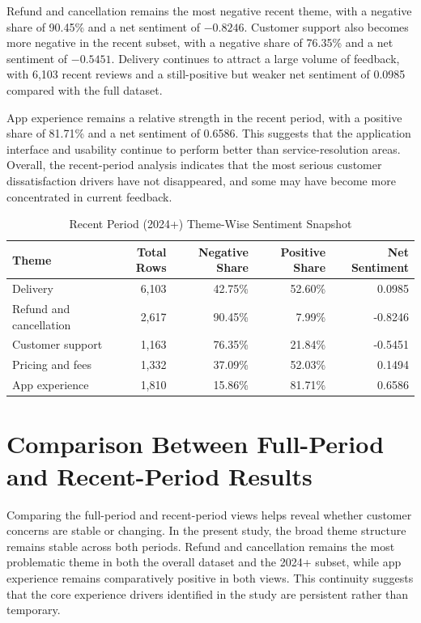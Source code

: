 Refund and cancellation remains the most negative recent theme, with a negative share of 90.45\% and a net sentiment of $-0.8246$. Customer support also becomes more negative in the recent subset, with a negative share of 76.35\% and a net sentiment of $-0.5451$. Delivery continues to attract a large volume of feedback, with 6,103 recent reviews and a still-positive but weaker net sentiment of 0.0985 compared with the full dataset.

App experience remains a relative strength in the recent period, with a positive share of 81.71\% and a net sentiment of 0.6586. This suggests that the application interface and usability continue to perform better than service-resolution areas. Overall, the recent-period analysis indicates that the most serious customer dissatisfaction drivers have not disappeared, and some may have become more concentrated in current feedback.


\begin{table}[h]
\centering
\caption{Recent Period (2024+) Theme-Wise Sentiment Snapshot}
\begin{tabular}{lrrrr}
\toprule
\textbf{Theme} & \textbf{Total Rows} & \textbf{Negative Share} & \textbf{Positive Share} & \textbf{Net Sentiment} \\
\midrule
Delivery & 6,103 & 42.75\% & 52.60\% & 0.0985 \\
Refund and cancellation & 2,617 & 90.45\% & 7.99\% & -0.8246 \\
Customer support & 1,163 & 76.35\% & 21.84\% & -0.5451 \\
Pricing and fees & 1,332 & 37.09\% & 52.03\% & 0.1494 \\
App experience & 1,810 & 15.86\% & 81.71\% & 0.6586 \\
\bottomrule
\end{tabular}
\end{table}

\section{Comparison Between Full-Period and Recent-Period Results}

Comparing the full-period and recent-period views helps reveal whether customer concerns are stable or changing. In the present study, the broad theme structure remains stable across both periods. Refund and cancellation remains the most problematic theme in both the overall dataset and the 2024+ subset, while app experience remains comparatively positive in both views. This continuity suggests that the core experience drivers identified in the study are persistent rather than temporary.

